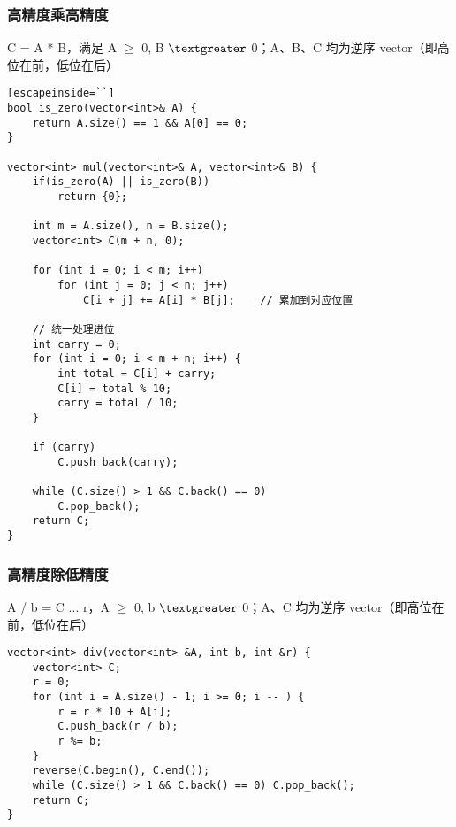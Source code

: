 \documentclass[UTF8]{article}
\begin{document}
\subsubsection{高精度乘高精度}
C = A * B，满足 A $\ge$ 0, B $\textgreater$ 0；A、B、C 均为逆序 vector（即高位在前，低位在后）
\begin{lstlisting}[caption=高精度乘高精度][escapeinside=``]
bool is_zero(vector<int>& A) {
    return A.size() == 1 && A[0] == 0;
}

vector<int> mul(vector<int>& A, vector<int>& B) {
    if(is_zero(A) || is_zero(B))
        return {0};
    
    int m = A.size(), n = B.size();
    vector<int> C(m + n, 0); 
    
    for (int i = 0; i < m; i++) 
        for (int j = 0; j < n; j++) 
            C[i + j] += A[i] * B[j];	// 累加到对应位置
    
    // 统一处理进位
    int carry = 0;
    for (int i = 0; i < m + n; i++) {
        int total = C[i] + carry;
        C[i] = total % 10;  
        carry = total / 10;   
    }
    
    if (carry) 
        C.push_back(carry);
    
    while (C.size() > 1 && C.back() == 0) 
        C.pop_back();
    return C;
}
\end{lstlisting}

\subsubsection{高精度除低精度}
A / b = C ... r，A $\ge$ 0, b $\textgreater$ 0；A、C 均为逆序 vector（即高位在前，低位在后）
\begin{lstlisting}[caption=高精度除低精度]
vector<int> div(vector<int> &A, int b, int &r) {
    vector<int> C;
    r = 0;
    for (int i = A.size() - 1; i >= 0; i -- ) {
        r = r * 10 + A[i];
        C.push_back(r / b);
        r %= b;
    }
    reverse(C.begin(), C.end());
    while (C.size() > 1 && C.back() == 0) C.pop_back();
    return C;
}
\end{lstlisting}
\end{document}
